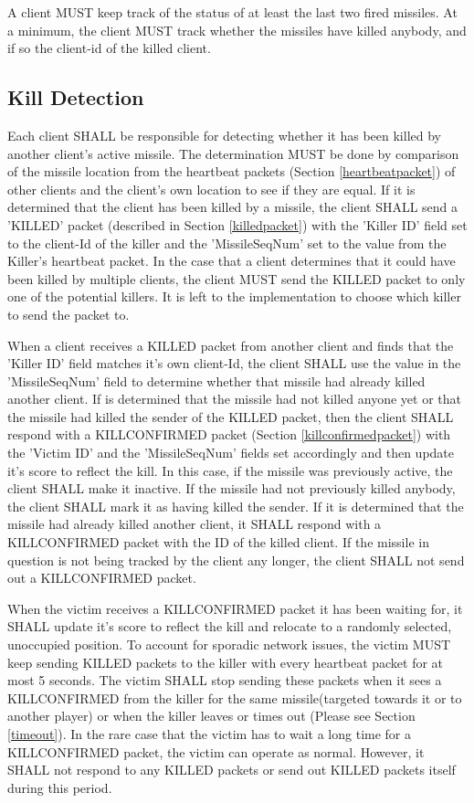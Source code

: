 \documentclass[11pt]{article} %
\begin{document}
A client MUST keep track of the status of at least the last two fired missiles. 
At a minimum, the client MUST track whether the 
missiles have killed anybody, and if so the client-id of the killed client.

\subsection{Kill Detection}
\label{killoperation}
Each client SHALL be responsible for detecting whether it has been killed by
another client's active missile. The determination MUST be done by comparison of
the missile location from the heartbeat packets (Section \ref{heartbeatpacket}) 
of other clients and the client's own location to see if they are equal. If 
it is determined that the client has been killed by a missile, the client 
SHALL send a 'KILLED' packet (described in Section \ref{killedpacket}) 
with the 'Killer ID' field set to the client-Id of the killer and the 
'MissileSeqNum' set to the value from the Killer's heartbeat packet. In the 
case that a client determines that it could have been killed by multiple 
clients, the client MUST send the KILLED packet to only one of the potential 
killers. It is left to the implementation to choose which killer to send the 
packet to.

When a client receives a KILLED packet from another client and finds that the
'Killer ID' field matches it's own client-Id, the client SHALL use the value in
the 'MissileSeqNum' field to determine whether that missile had already killed 
another client. If is determined that the missile had not killed anyone yet or
that the missile had killed the sender of the KILLED packet, then the client
SHALL respond with a KILLCONFIRMED packet (Section \ref{killconfirmedpacket}) with
the 'Victim ID' and the 'MissileSeqNum' fields set accordingly and then update
it's score to reflect the kill. In this case, if the missile was previously active, 
the client SHALL make it inactive. If the missile had not previously killed 
anybody, the client SHALL mark it as having killed the sender. If it is 
determined that the missile had already killed another client, it SHALL respond with
a KILLCONFIRMED packet with the ID of the killed client. 
If the missile in question is not being tracked by the client any longer, the client 
SHALL not send out a KILLCONFIRMED packet.

When the victim receives a KILLCONFIRMED packet it has been waiting for, it SHALL
update it's score to reflect the kill and relocate to a randomly selected,
unoccupied position. To account for sporadic network issues, the victim
MUST keep sending KILLED packets to the killer with every heartbeat packet for
at most 5 seconds. The victim SHALL stop sending these packets when it sees a
KILLCONFIRMED from the killer for the same missile(targeted towards it or to
another player) or when the killer leaves or times out (Please see Section
\ref{timeout}). In the rare case that the victim has to wait a long time for a
KILLCONFIRMED packet, the victim can operate as normal. However, it SHALL not
respond to any KILLED packets or send out KILLED packets itself during this
period.
\end{document}
